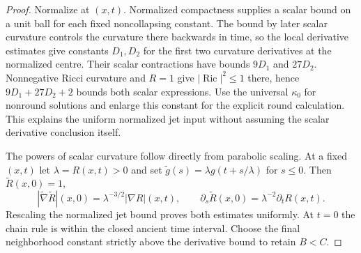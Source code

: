 \begin{proof}
Normalize at $(x,t)$.  Normalized compactness supplies a scalar bound
on a unit ball for each fixed noncollapsing constant.  The bound by later scalar
curvature controls the curvature there backwards in time, so the local
derivative estimates give constants $D_1,D_2$ for the first two curvature
derivatives at the normalized centre.  Their scalar contractions have
bounds $9D_1$ and $27D_2$.  Nonnegative Ricci curvature and $R=1$ give
$|\operatorname{Ric}|^2\le1$ there, hence
$9D_1+27D_2+2$ bounds both scalar expressions.  Use the universal
$\kappa_0$ for nonround solutions and enlarge this constant for the
explicit round calculation.  This explains the uniform normalized jet
input without assuming the scalar derivative conclusion itself.

The powers of scalar curvature follow directly from parabolic scaling.
At a fixed $(x,t)$ let $\lambda=R(x,t)>0$ and set
$\widetilde g(s)=\lambda g(t+s/\lambda)$ for $s\le0$.
Then $\widetilde R(x,0)=1$,
\[
 |\widetilde\nabla\widetilde R|(x,0)
       =\lambda^{-3/2}|\nabla R|(x,t),\qquad
 \partial_s\widetilde R(x,0)=\lambda^{-2}\partial_tR(x,t).
\]
Rescaling the normalized jet bound proves both estimates uniformly.
At $t=0$ the chain rule is within the closed ancient time interval.
Choose the final neighborhood constant strictly above the derivative
bound to retain $B<C$.


\end{proof}
